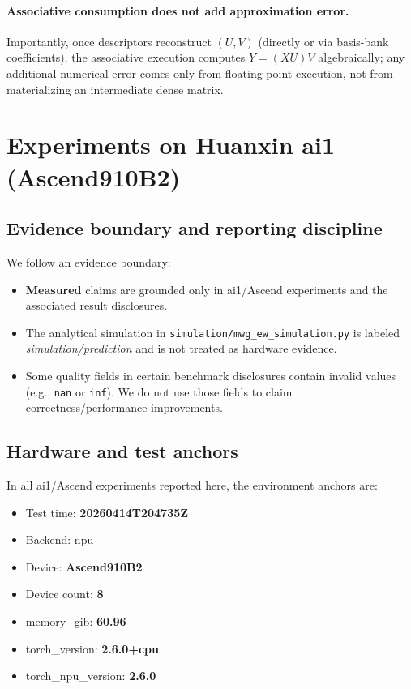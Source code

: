 \documentclass[11pt]{article}
\begin{document}
\paragraph{Associative consumption does not add approximation error.}
Importantly, once descriptors reconstruct $(U,V)$ (directly or via basis-bank coefficients), the associative execution computes $Y=(XU)V$ algebraically; any additional numerical error comes only from floating-point execution, not from materializing an intermediate dense matrix.

\section{Experiments on Huanxin ai1 (Ascend910B2)}
\subsection{Evidence boundary and reporting discipline}
We follow an evidence boundary:
\begin{itemize}[leftmargin=1.2em]
  \item \textbf{Measured} claims are grounded only in ai1/Ascend experiments and the associated result disclosures.
  \item The analytical simulation in \texttt{simulation/mwg\_ew\_simulation.py} is labeled 
  \emph{simulation/prediction} and is not treated as hardware evidence.
  \item Some quality fields in certain benchmark disclosures contain invalid values (e.g., \texttt{nan} or \texttt{inf}). We do not use those fields to claim correctness/performance improvements.
\end{itemize}

\subsection{Hardware and test anchors}
In all ai1/Ascend experiments reported here, the environment anchors are:
\begin{itemize}[leftmargin=1.2em]
  \item Test time: \textbf{20260414T204735Z}
  \item Backend: npu
  \item Device: \textbf{Ascend910B2}
  \item Device count: \textbf{8}
  \item memory\_gib: \textbf{60.96}
  \item torch\_version: \textbf{2.6.0+cpu}
  \item torch\_npu\_version: \textbf{2.6.0}
\end{itemize}
\end{document}
